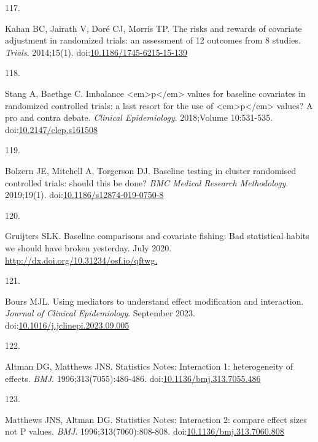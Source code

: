 \documentclass[
]{book}
\newlength{\cslhangindent}
\newlength{\csllabelwidth}
\newlength{\cslentryspacingunit} %
\newenvironment{CSLReferences}[2] %
 {%
  \setlength{\parindent}{0pt}
  \ifodd #1
  \let\oldpar\par
  \def\par{\hangindent=\cslhangindent\oldpar}
  \fi
  \setlength{\parskip}{#2\cslentryspacingunit}
 }%
 {}
\newcommand{\CSLLeftMargin}[1]{\parbox[t]{\csllabelwidth}{#1}}
\newcommand{\CSLRightInline}[1]{\parbox[t]{\linewidth - \csllabelwidth}{#1}\break}
\begin{document}
\begin{CSLReferences}{0}{0}
\leavevmode{}%
\CSLLeftMargin{117. }%
\CSLRightInline{Kahan BC, Jairath V, Doré CJ, Morris TP. The risks and rewards of covariate adjustment in randomized trials: an assessment of 12 outcomes from 8 studies. \emph{Trials}. 2014;15(1). doi:\href{https://doi.org/10.1186/1745-6215-15-139}{10.1186/1745-6215-15-139}}

\leavevmode{}%
\CSLLeftMargin{118. }%
\CSLRightInline{Stang A, Baethge C. Imbalance \textless em\textgreater p\textless/em\textgreater{} values for baseline covariates in randomized controlled trials: a last resort for the use of \textless em\textgreater p\textless/em\textgreater{} values? A pro and contra debate. \emph{Clinical Epidemiology}. 2018;Volume 10:531-535. doi:\href{https://doi.org/10.2147/clep.s161508}{10.2147/clep.s161508}}

\leavevmode{}%
\CSLLeftMargin{119. }%
\CSLRightInline{Bolzern JE, Mitchell A, Torgerson DJ. Baseline testing in cluster randomised controlled trials: should this be done? \emph{BMC Medical Research Methodology}. 2019;19(1). doi:\href{https://doi.org/10.1186/s12874-019-0750-8}{10.1186/s12874-019-0750-8}}

\leavevmode{}%
\CSLLeftMargin{120. }%
\CSLRightInline{Gruijters SLK. Baseline comparisons and covariate fishing: Bad statistical habits we should have broken yesterday. July 2020. \href{http://dx.doi.org/10.31234/osf.io/qftwg}{http://dx.doi.org/10.31234/osf.io/qftwg.}}

\leavevmode{}%
\CSLLeftMargin{121. }%
\CSLRightInline{Bours MJL. Using mediators to understand effect modification and interaction. \emph{Journal of Clinical Epidemiology}. September 2023. doi:\href{https://doi.org/10.1016/j.jclinepi.2023.09.005}{10.1016/j.jclinepi.2023.09.005}}

\leavevmode{}%
\CSLLeftMargin{122. }%
\CSLRightInline{Altman DG, Matthews JNS. Statistics Notes: Interaction 1: heterogeneity of effects. \emph{BMJ}. 1996;313(7055):486-486. doi:\href{https://doi.org/10.1136/bmj.313.7055.486}{10.1136/bmj.313.7055.486}}

\leavevmode{}%
\CSLLeftMargin{123. }%
\CSLRightInline{Matthews JNS, Altman DG. Statistics Notes: Interaction 2: compare effect sizes not P values. \emph{BMJ}. 1996;313(7060):808-808. doi:\href{https://doi.org/10.1136/bmj.313.7060.808}{10.1136/bmj.313.7060.808}}


\end{CSLReferences}
\end{document}
